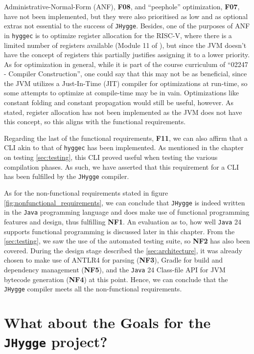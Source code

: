 Administrative-Normal-Form (ANF), \textbf{F08}, and ``peephole'' optimization, \textbf{F07}, have not been implemented, but they were also prioritised as low and as optional
extras not essential to the success of \texttt{JHygge}. Besides, one of the purposes of ANF in \texttt{hyggec} is to optimize register
allocation for the RISC-V, where there is a limited number of registers available (Module 11 of \cite{lecture_notes}), but since the JVM doesn't have the concept of registers
this partially justifies assigning it to a lower priority. As for optimization in general, while it is part of the course
curriculum of ``02247 - Compiler Construction''\cite{curriculum_02247}, one could say that this may not be as beneficial, since the JVM utilizes a Just-In-Time (JIT)
compiler for optimizations at run-time\cite{jvm_spec}, so some attempts to optimize at compile-time may be in vain. Optimizations like constant folding
and constant propagation would still be useful, however. As stated, register allocation has not been implemented as the JVM does not have
this concept, so this aligns with the functional requirements.

Regarding the last of the functional requirements, \textbf{F11}, we can also affirm that a CLI akin to that of \texttt{hyggec} has been implemented. As
mentioned in the chapter on testing \ref{sec:testing}, this CLI proved useful when testing the various compilation phases.
As such, we have asserted that this requirement for a CLI has been fulfilled by the \texttt{JHygge} compiler.

As for the non-functional requirements stated in figure \ref{fig:nonfunctional_requirements}, we can conclude that \texttt{JHygge} is indeed written in the \texttt{Java} programming language and does make use of functional programming features and design,
thus fulfilling \textbf{NF1}.
An evaluation as to, how well \texttt{Java} 24 supports functional programming
is discussed later in this chapter. From the \ref{sec:testing}, we saw the use of the automated testing suite, so \textbf{NF2}
has also been covered. During the design stage described the \ref{sec:architecture}, it was already chosen to make use
of ANTLR4 for parsing (\textbf{NF3}), Gradle for build and dependency management (\textbf{NF5}), and
the \texttt{Java} 24 Class-file API\cite{jep484} for JVM bytecode generation (\textbf{NF4}) at this point.
Hence, we can conclude that the \texttt{JHygge} compiler meets all the non-functional requirements.

\section{What about the Goals for the \texttt{JHygge} project?}


